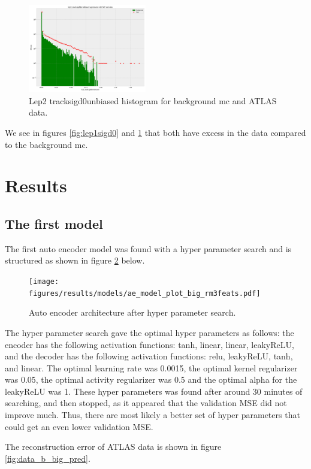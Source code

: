 \documentclass[ reprint, amsmath,amssymb, aps, nofootinbib]{revtex4-2}
\begin{document}
\begin{figure}[H]
    \centering
    \includegraphics[width=0.46\textwidth]{figures/implementation/lep2_tracksigd0pvunbiased.pdf}
    \caption{Lep2 tracksigd0unbiased histogram for background mc and ATLAS data.}
    \label{fig:lep2sigd0}
\end{figure}

We see in figures \ref{fig:lep1sigd0} and \ref{fig:lep2sigd0} that both have excess in the data compared to the background mc. 


\section{Results}

\subsection{The first model}

The first auto encoder model was found with a hyper parameter search and is structured as shown in figure \ref{fig:big_ae_plot} below. 

\begin{figure}[H]
    \centering
    \texttt{[image: figures/results/models/ae\_model\_plot\_big\_rm3feats.pdf]}
    \caption{Auto encoder architecture after hyper parameter search. }
    \label{fig:big_ae_plot}
\end{figure}
The hyper parameter search gave the optimal hyper parameters as follows: the encoder has the following activation functions: tanh, linear, linear, leakyReLU, and the decoder has the following activation functions: relu, leakyReLU, tanh, and linear. The optimal learning rate was 0.0015, the optimal kernel regularizer was 0.05, the optimal activity regularizer was 0.5 and the optimal alpha for the leakyReLU was 1. These hyper parameters was found after around 30 minutes of searching, and then stopped, as it appeared that the validation MSE did not improve much. Thus, there are most likely a better set of hyper parameters that could get an even lower validation MSE. \par 
The reconstruction error of ATLAS data is shown in figure \ref{fig:data_b_big_pred}.
\end{document}

